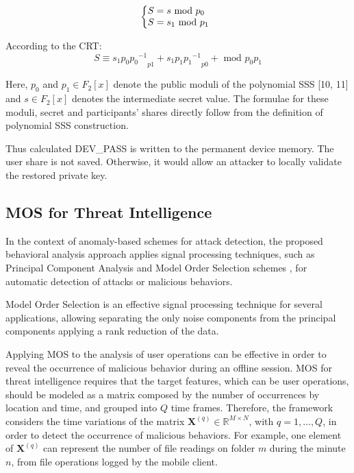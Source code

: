 \documentclass[twocolumn]{svjour3}          	%
\begin{document}
\begin{equation}\label{eq:eq01}
  \left\{
  \begin{array}{@{}ll@{}}
    S = s \textrm{ mod } p_0
    \\
    S = s_1 \textrm{ mod } p_1
  \end{array}\right.
\end{equation}

According to the CRT:
\begin{equation}\label{eq:eq02}
S \equiv {s_{1}p_{0}{p_0}^{-1}}_{p1} + {s_{1}p_{1}{p_1}^{-1}}_{p0} + \textrm{ mod } p_0p_1
\end{equation}

Here, $p_0$ and $p_1 \in F_2[x]$ denote the public moduli of the polynomial SSS [10, 11]  and $s \in F_2[x]$ denotes the intermediate secret value. The formulae for these moduli, secret and participants’ shares directly follow from the definition of polynomial SSS construction.

Thus calculated DEV\_PASS is written to the permanent device memory. The user share is not saved. Otherwise, it would allow an attacker to locally validate the restored private key.

\subsection{MOS for Threat Intelligence}
\label{sec_mos}
In the context of anomaly-based schemes for attack detection, the proposed behavioral analysis approach applies signal processing techniques, such as Principal Component Analysis and Model Order Selection schemes \cite{tenorio2013greatest}, for automatic detection of attacks or malicious behaviors. 

Model Order Selection is an effective signal processing technique for several applications, allowing separating the only noise components from the principal components applying a rank reduction of the data. 

Applying MOS to the analysis of user operations can be effective in order to reveal the occurrence of malicious behavior during an offline session. MOS for threat intelligence requires that the target features, which can be user operations, should be modeled as a matrix composed by the number of occurrences by location and time, and grouped into $Q$ time frames. Therefore, the framework considers the time variations of the matrix $\mathbf{X}^{(q)} \in \mathbb{R}^{M\times{N}}$, with $q = 1, \ldots, Q$, in order to detect the occurrence of malicious behaviors. For example, one element of $\mathbf{X}^{(q)}$ can represent the number of file readings on folder $m$ during the minute $n$, from file operations logged by the mobile client.
\end{document}
